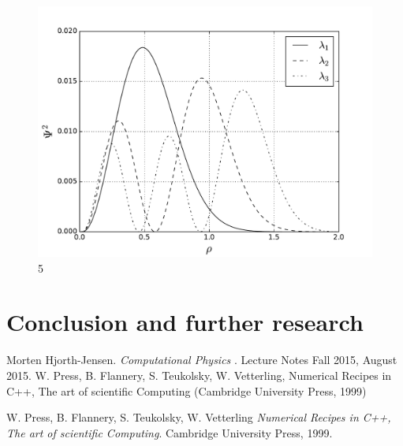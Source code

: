 \documentclass[10pt]{article}
\begin{document}
\begin{figure}
  \begin{center}
    \includegraphics[scale=0.7]{two_5}
    \caption{5}
    \label{fig:omega_5}
  \end{center}
\end{figure}
\newpage


\section{Conclusion and further research}

\newpage
\begin{thebibliography}{2}
Morten Hjorth-Jensen. 
\textit{Computational Physics
}. 
Lecture Notes Fall 2015, August 2015.
 W. Press, B. Flannery, S. Teukolsky, W. Vetterling, Numerical Recipes in C++, The art of scientific Computing (Cambridge University Press, 1999)

W. Press, B. Flannery, S. Teukolsky, W. Vetterling 
\textit{Numerical Recipes in C++, The art of scientific Computing}. 
Cambridge University Press, 1999.
 
\end{thebibliography}
\end{document}

